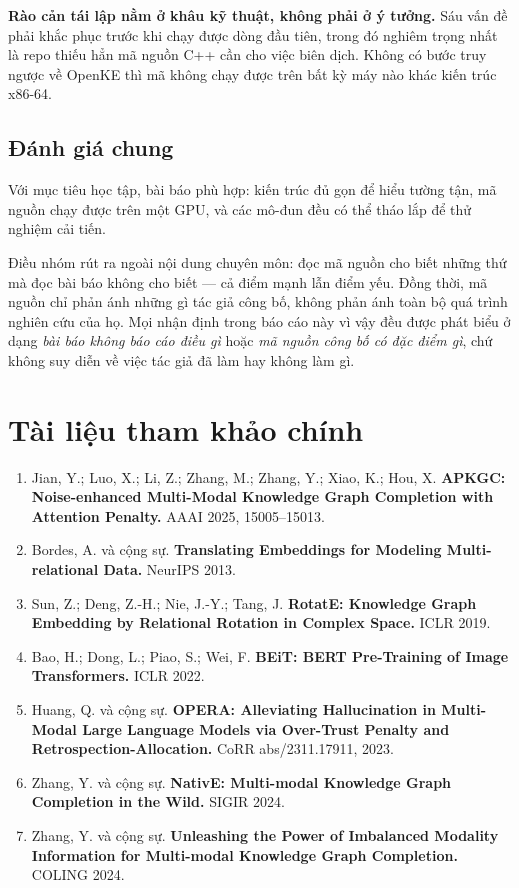 \documentclass[11pt,a4paper]{article}
\begin{document}
\textbf{Rào cản tái lập nằm ở khâu kỹ thuật, không phải ở ý tưởng.} Sáu vấn đề phải khắc phục trước khi chạy được dòng đầu tiên, trong đó nghiêm trọng nhất là repo thiếu hẳn mã nguồn C++ cần cho việc biên dịch. Không có bước truy ngược về OpenKE thì mã không chạy được trên bất kỳ máy nào khác kiến trúc x86-64.

\subsection{Đánh giá chung}
Với mục tiêu học tập, bài báo phù hợp: kiến trúc đủ gọn để hiểu tường tận, mã nguồn chạy được trên một GPU, và các mô-đun đều có thể tháo lắp để thử nghiệm cải tiến.

Điều nhóm rút ra ngoài nội dung chuyên môn: đọc mã nguồn cho biết những thứ mà đọc bài báo không cho biết --- cả điểm mạnh lẫn điểm yếu. Đồng thời, mã nguồn chỉ phản ánh những gì tác giả công bố, không phản ánh toàn bộ quá trình nghiên cứu của họ. Mọi nhận định trong báo cáo này vì vậy đều được phát biểu ở dạng \emph{bài báo không báo cáo điều gì} hoặc \emph{mã nguồn công bố có đặc điểm gì}, chứ không suy diễn về việc tác giả đã làm hay không làm gì.

\section{Tài liệu tham khảo chính}
\begin{enumerate}\itemsep2pt
\item Jian, Y.; Luo, X.; Li, Z.; Zhang, M.; Zhang, Y.; Xiao, K.; Hou, X. \textbf{APKGC: Noise-enhanced Multi-Modal Knowledge Graph Completion with Attention Penalty.} AAAI 2025, 15005--15013.
\item Bordes, A. và cộng sự. \textbf{Translating Embeddings for Modeling Multi-relational Data.} NeurIPS 2013.
\item Sun, Z.; Deng, Z.-H.; Nie, J.-Y.; Tang, J. \textbf{RotatE: Knowledge Graph Embedding by Relational Rotation in Complex Space.} ICLR 2019.
\item Bao, H.; Dong, L.; Piao, S.; Wei, F. \textbf{BEiT: BERT Pre-Training of Image Transformers.} ICLR 2022.
\item Huang, Q. và cộng sự. \textbf{OPERA: Alleviating Hallucination in Multi-Modal Large Language Models via Over-Trust Penalty and Retrospection-Allocation.} CoRR abs/2311.17911, 2023.
\item Zhang, Y. và cộng sự. \textbf{NativE: Multi-modal Knowledge Graph Completion in the Wild.} SIGIR 2024.
\item Zhang, Y. và cộng sự. \textbf{Unleashing the Power of Imbalanced Modality Information for Multi-modal Knowledge Graph Completion.} COLING 2024.
\end{enumerate}
\end{document}
